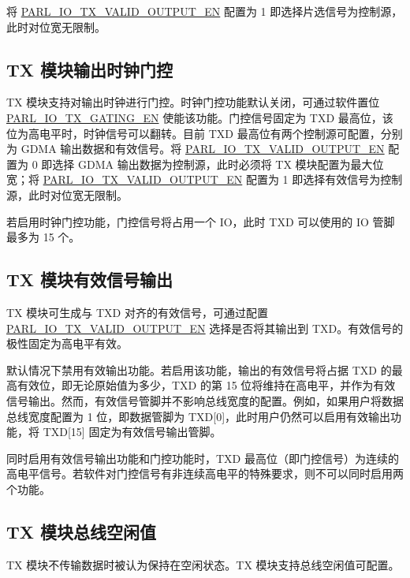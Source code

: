 \documentclass[main\_\_CN.tex]{subfiles}
\begin{document}
{将 \hyperref[fielddesc:PARLIOTXVALIDOUTPUTEN]{PARL\_IO\_TX\_VALID\_OUTPUT\_EN} 配置为 1 即选择片选信号为控制源，此时对位宽无限制。
}
{
\subsection{TX 模块输出时钟门控}

TX 模块支持对输出时钟进行门控。时钟门控功能默认关闭，可通过软件置位 \hyperref[fielddesc:PARLIOTXGATINGEN]{PARL\_IO\_TX\_GATING\_EN} 使能该功能。门控信号固定为 TXD 最高位，该位为高电平时，时钟信号可以翻转。目前 TXD 最高位有两个控制源可配置，分别为 GDMA 输出数据和有效信号。将 \hyperref[fielddesc:PARLIOTXVALIDOUTPUTEN]{PARL\_IO\_TX\_VALID\_OUTPUT\_EN} 配置为 0 即选择 GDMA 输出数据为控制源，此时必须将 TX 模块配置为最大位宽；将 \hyperref[fielddesc:PARLIOTXVALIDOUTPUTEN]{PARL\_IO\_TX\_VALID\_OUTPUT\_EN} 配置为 1 即选择有效信号为控制源，此时对位宽无限制。

若启用时钟门控功能，门控信号将占用一个 IO，此时 TXD 可以使用的 IO 管脚最多为 15 个。


\subsection{TX 模块有效信号输出}

TX 模块可生成与 TXD 对齐的有效信号，可通过配置 \hyperref[fielddesc:PARLIOTXVALIDOUTPUTEN]{PARL\_IO\_TX\_VALID\_OUTPUT\_EN} 选择是否将其输出到 TXD。有效信号的极性固定为高电平有效。

默认情况下禁用有效输出功能。若启用该功能，输出的有效信号将占据 TXD 的最高有效位，即无论原始值为多少，TXD 的第 15 位将维持在高电平，并作为有效信号输出。然而，有效信号管脚并不影响总线宽度的配置。例如，如果用户将数据总线宽度配置为 1 位，即数据管脚为 TXD[0]，此时用户仍然可以启用有效输出功能，将 TXD[15] 固定为有效信号输出管脚。

\begin{tiplisting}
同时启用有效信号输出功能和门控功能时，TXD 最高位（即门控信号）为连续的高电平信号。若软件对门控信号有非连续高电平的特殊要求，则不可以同时启用两个功能。
\end{tiplisting}
}

\subsection{TX 模块总线空闲值}\label{subsec:parlio-tx-bus-idle-value}

TX 模块不传输数据时被认为保持在空闲状态。TX 模块支持总线空闲值可配置。
\end{document}
